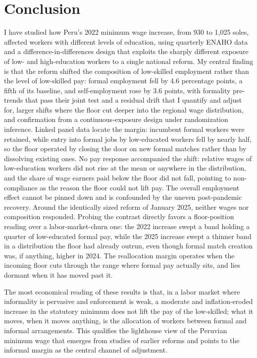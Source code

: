 \section{Conclusion}\label{sec:conclusion}

I have studied how Peru's 2022 minimum wage increase, from 930 to 1,025 soles, affected
workers with different levels of education, using quarterly ENAHO data and a
difference-in-differences design that exploits the sharply different exposure of low- and
high-education workers to a single national reform. My central finding is that the reform
shifted the composition of low-skilled employment rather than the level of low-skilled
pay: formal employment fell by 4.6 percentage points, a fifth of its baseline, and
self-employment rose by 3.6 points, with formality pre-trends that pass their joint
test and a residual drift that I quantify and adjust for, larger shifts where the floor
cut deeper into the regional wage distribution, and confirmation from a
continuous-exposure design under randomization inference. Linked panel data locate
the margin: incumbent formal workers were retained, while entry into formal jobs by
low-educated workers fell by nearly half, so the floor operated by closing the door
on new formal matches rather than by dissolving existing ones. No pay response accompanied the
shift: relative wages of low-education workers did not rise at the mean or anywhere in
the distribution, and the share of wage earners paid below the floor did not fall,
pointing to non-compliance as the reason the floor could not lift pay. The overall
employment effect cannot be pinned down and is confounded by the uneven post-pandemic
recovery. Around the identically sized reform of January 2025, neither wages nor
composition responded. Probing the contrast directly favors a floor-position reading
over a labor-market-churn one: the 2022 increase swept a band holding a quarter of
low-educated formal pay, while the 2025 increase swept a thinner band in a
distribution the floor had already outrun, even though formal match creation was, if
anything, higher in 2024. The reallocation margin operates when the incoming floor
cuts through the range where formal pay actually sits, and lies dormant when it has
moved past it.

The most economical reading of these results is that, in a labor market where informality
is pervasive and enforcement is weak, a moderate and inflation-eroded increase in the
statutory minimum does not lift the pay of the low-skilled; what it moves, when it moves
anything, is the allocation of workers between formal and informal arrangements. This
qualifies the lighthouse view of the Peruvian minimum wage that emerges from studies of
earlier reforms and points to the informal margin as the central channel of adjustment.

